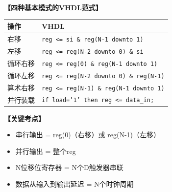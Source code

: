 \begin{solution}[完整解答]

\textbf{【四种基本模式的VHDL范式】}

\begin{center}
\begin{tabular}{|l|l|}\hline
\textbf{操作} & \textbf{VHDL} \\ \hline
右移 & \texttt{reg <= si \& reg(N-1 downto 1)} \\ \hline
左移 & \texttt{reg <= reg(N-2 downto 0) \& si} \\ \hline
循环右移 & \texttt{reg <= reg(0) \& reg(N-1 downto 1)} \\ \hline
循环左移 & \texttt{reg <= reg(N-2 downto 0) \& reg(N-1)} \\ \hline
算术右移 & \texttt{reg <= reg(N-1) \& reg(N-1 downto 1)} \\ \hline
并行装载 & \texttt{if load='1' then reg <= data\_in;} \\ \hline
\end{tabular}
\end{center}

\textbf{【关键考点】}
\begin{itemize}
  \item 串行输出 = reg(0)（右移）或 reg(N-1)（左移）
  \item 并行输出 = 整个reg
  \item N位移位寄存器 = N个D触发器串联
  \item 数据从输入到输出延迟 = N个时钟周期
\end{itemize}

\end{solution}

